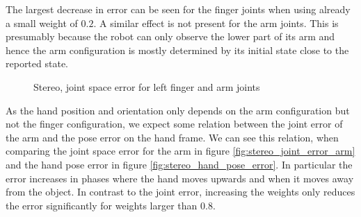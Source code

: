 The largest decrease in error can be seen for the finger joints when using already a small weight of $0.2$. A similar effect is not present for the arm joints. This is presumably because the robot can only observe the lower part of its arm and hence the arm configuration is mostly determined by its initial state close to the reported state.


\begin{figure}
\centering
{}

\caption{Stereo, joint space error for left finger and arm joints}
\label{fig:stereo_joint_error}
\end{figure}

As the hand position and orientation only depends on the arm configuration but not the finger configuration, we expect some relation between the joint error of the arm and the pose error on the hand frame. We can see this relation, when comparing the joint space error for the arm in figure \ref{fig:stereo_joint_error_arm} and the hand pose error in figure \ref{fig:stereo_hand_pose_error}. In particular the error increases in phases where the hand moves upwards and when it moves away from the object. In contrast to the joint error, increasing the weights only reduces the error significantly for weights larger than $0.8$.


